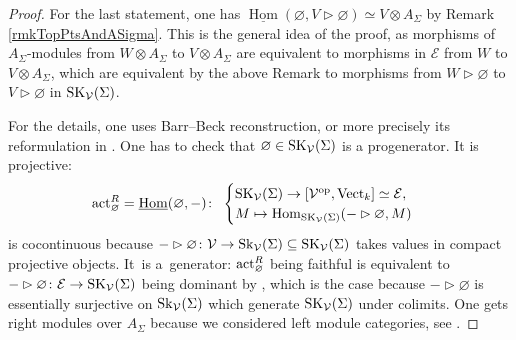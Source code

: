 \documentclass[pdftex]{sigma}%
\numberwithin{equation}{section}
\newcommand{\Hom}{\operatorname{Hom}}
\newcommand{\undHom}{\underline{\operatorname{Hom}}}
\begin{document}
\begin{proof}
For the last statement, one has $\undHom(\varnothing,V\rhd\varnothing) \simeq V \otimes A_\Sigma$ by Remark \ref{rmkTopPtsAndASigma}. This is the general idea of the proof, as morphisms of $A_\Sigma$-modules from $W \otimes A_\Sigma$ to $V \otimes A_\Sigma$ are equivalent to morphisms in $\mathcal{E}$ from $W$ to $V\otimes A_\Sigma$, which are equivalent by the above Remark to morphisms from $W\rhd\varnothing$ to $V\rhd \varnothing$ in ${\rm SK}_\mathcal{V}(\Sigma)$.

For the details, one uses Barr--Beck reconstruction, or more precisely its reformulation in \cite[Theorem~4.6]{BBJ}. One has to check that $\varnothing \in {\rm SK}_\mathcal{V}(\Sigma)$ is a progenerator.
It is projective:
\[
{\rm act}_\varnothing^R= \undHom(\varnothing,-) \colon\
\begin{cases}
{\rm SK}_\mathcal{V}(\Sigma)  \to  [\mathcal{V}^{\rm op},{\rm Vect}_k]\simeq \mathcal{E},
\\
M  \mapsto  \Hom_{{\rm SK}_\mathcal{V}(\Sigma)}(-\rhd\varnothing,M)
\end{cases}
\]
is cocontinuous because $-\rhd \varnothing \colon \mathcal{V} \to {\rm Sk}_\mathcal{V}(\Sigma) \subseteq {\rm SK}_\mathcal{V}(\Sigma)$ takes values in compact projective objects.
It~is a~generator: ${\rm act}_\varnothing^R$ being faithful is equivalent to $-\rhd \varnothing\colon \mathcal{E} \to {\rm SK}_\mathcal{V}(\Sigma)$ being dominant by \cite[Remark~4.9]{BBJ}, which is the case because $-\rhd \varnothing$ is essentially surjective on ${\rm Sk}_\mathcal{V}(\Sigma)$ which generate ${\rm SK}_\mathcal{V}(\Sigma)$ under colimits.
One gets right modules over $A_\Sigma$ because we considered left module categories, see \cite[Remark~4.7]{BBJ}.
\end{proof}
\end{document}
